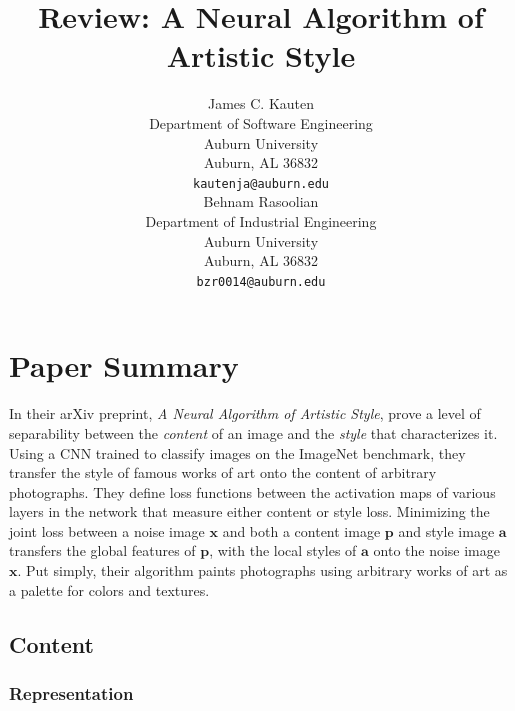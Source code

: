 \documentclass{article}
\begin{document}
\title{Review: A Neural Algorithm of Artistic Style}


\author{
    James C. Kauten \\
    Department of Software Engineering \\
    Auburn University \\
    Auburn, AL 36832 \\
    \texttt{kautenja@auburn.edu} \\
    \And
    Behnam Rasoolian \\
    Department of Industrial Engineering \\
    Auburn University \\
    Auburn, AL 36832 \\
    \texttt{bzr0014@auburn.edu} \\
}

\maketitle

\section{Paper Summary}

In their arXiv preprint, \textit{A Neural Algorithm of Artistic Style},
\cite{2015arXiv150806576G} prove a level of separability between the
\textit{content} of an image and the \textit{style} that characterizes it.
Using a \ac{CNN} trained to classify images on the ImageNet benchmark, they
transfer the style of famous works of art onto the content of arbitrary
photographs. They define loss functions between the activation maps of
various layers in the network that measure either content or style loss.
Minimizing the joint loss between a noise image $\textbf{x}$ and both a
content image $\textbf{p}$ and style image $\textbf{a}$ transfers the global
features of $\textbf{p}$, with the local styles of $\textbf{a}$ onto the
noise image $\textbf{x}$. Put simply, their algorithm paints photographs using
arbitrary works of art as a palette for colors and textures.


\subsection{Content}

\subsubsection{Representation}
\end{document}
